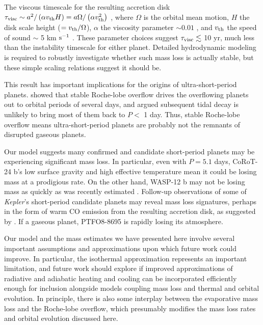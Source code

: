 \documentclass{aastex}
\newcommand{\kepler}{{\it Kepler}}
\begin{document}
The viscous timescale for the resulting accretion disk $\tau_{\rm visc} \sim a^2/\left( \alpha v_{\rm th} H \right) = a \Omega/\left( \alpha v_{\rm th}^2\right)$ \citep{1981ARA&A..19..137P}, where $\Omega$ is the orbital mean motion, $H$ the disk scale height ($= v_{\rm th}/\Omega$), $\alpha$ the viscosity parameter $\sim 0.01$ \citep{2009ApJ...705.1206C}, and $v_{\rm th}$ the speed of sound $\sim$ 5 km ${\rm s^{-1}}$ \citep{2010Natur.463.1054L}. These parameter choices suggest $\tau_{\rm visc} \lesssim$ 10 yr, much less than the instability timescale for either planet. Detailed hydrodynamic modeling is required to robustly investigate whether such mass loss is actually stable, but these simple scaling relations suggest it should be. 

This result has important implications for the origins of ultra-short-period planets. \citet{2015ApJ...813..101V} showed that stable Roche-lobe overflow drives the overflowing planets out to orbital periods of several days, and \citet{2016arXiv160300392J} argued subsequent tidal decay is unlikely to bring most of them back to $P <$ 1 day. Thus, stable Roche-lobe overflow means ultra-short-period planets are probably not the remnants of disrupted gaseous planets.

Our model suggests many confirmed and candidate short-period planets may be experiencing significant mass loss. In particular, even with $P = 5.1$ days, CoRoT-24 b's low surface gravity and high effective temperature mean it could be losing mass at a prodigious rate. On the other hand, WASP-12 b may not be losing mass as quickly as was recently estimated \citep{2010Natur.463.1054L}. Follow-up observations of some of \kepler's short-period candidate planets may reveal mass loss signatures, perhaps in the form of warm CO emission from the resulting accretion disk, as suggested by \citet{2010Natur.463.1054L}. If a gaseous planet, PTFO8-8695 is rapidly losing its atmosphere.

Our model and the mass estimates we have presented here involve several important assumptions and approximations upon which future work could improve. In particular, the isothermal approximation represents an important limitation, and future work should explore if improved approximations of radiative and adiabatic heating and cooling can be incorporated efficiently enough for inclusion alongside models coupling mass loss and thermal and orbital evolution. In principle, there is also some interplay between the evaporative mass loss and the Roche-lobe overflow, which presumably modifies the mass loss rates and orbital evolution discussed here. 
\end{document}
